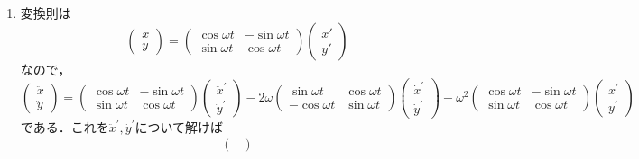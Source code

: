 \documentclass[a4paper,pdflatex,ja=standard]{bxjsarticle}
\begin{document}
\begin{enumerate}
  \item 
  変換則は
  \begin{equation}
    \begin{pmatrix}
      x \\
      y
    \end{pmatrix}
    =
    \begin{pmatrix}
      \cos\omega t & -\sin\omega t \\
      \sin \omega t & \cos \omega t
    \end{pmatrix}
    \begin{pmatrix}
      x' \\
      y'
    \end{pmatrix}
  \end{equation}
  なので，
  \begin{equation}
    \begin{pmatrix}
      \ddot{x} \\
      \ddot{y}
    \end{pmatrix}
    =
    \begin{pmatrix}
      \cos\omega t & -\sin\omega t \\
      \sin \omega t & \cos \omega t
    \end{pmatrix}
    \begin{pmatrix}
      \ddot{x}^{\prime} \\
      \ddot{y}^{\prime}
    \end{pmatrix}
    -
    2\omega
    \begin{pmatrix}
      \sin\omega t & \cos\omega t \\
      -\cos \omega t & \sin \omega t
    \end{pmatrix}
    \begin{pmatrix}
      \dot{x}^{\prime} \\
      \dot{y}^{\prime}
    \end{pmatrix}
    -
    \omega^2
    \begin{pmatrix}
      \cos\omega t & -\sin\omega t \\
      \sin \omega t & \cos \omega t
    \end{pmatrix}
    \begin{pmatrix}
      x^{\prime} \\
      y^{\prime}
    \end{pmatrix}
  \end{equation}
  である．これを$\ddot{x}^{\prime},\ddot{y}^{\prime}$について解けば
  \begin{align}
    \begin{pmatrix}

\end{pmatrix}
\end{align}
\end{enumerate}
\end{document}
